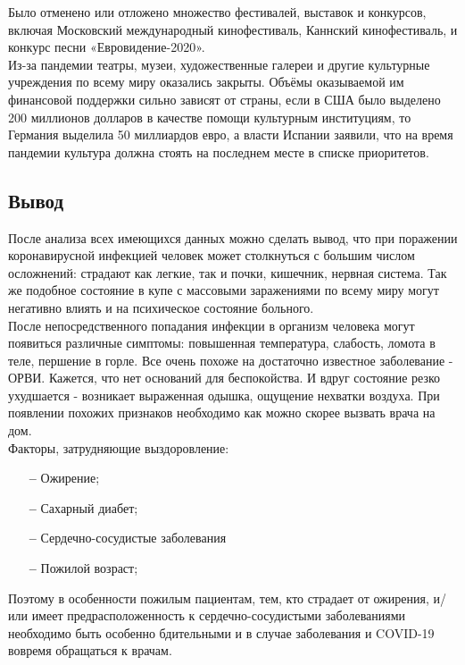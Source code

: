 \documentclass[a4paper, 12pt]{extarticle}
\begin{document}
Было отменено или отложено множество фестивалей, выставок и конкурсов, включая
Московский международный кинофестиваль, Каннский кинофестиваль, и конкурс песни
«Евровидение-2020».
\\

Из-за пандемии театры, музеи, художественные галереи и другие культурные
учреждения по всему миру оказались закрыты. Объёмы оказываемой им финансовой
поддержки сильно зависят от страны, если в США было выделено 200 миллионов
долларов в качестве помощи культурным институциям, то Германия выделила 50
миллиардов евро, а власти Испании заявили, что на время пандемии культура
должна стоять на последнем месте в списке приоритетов.
\newpage

\subsection{Вывод}
После анализа всех имеющихся данных можно сделать вывод, что
при поражении коронавирусной инфекцией человек может столкнуться с большим числом
осложнений: страдают как легкие, так и почки, кишечник, нервная система. Так же
подобное состояние в купе с массовыми заражениями по всему миру могут негативно
влиять и на психическое состояние больного.
\\

После непосредственного попадания инфекции в организм человека могут появиться
различные симптомы: повышенная температура, слабость, ломота в теле, першение в горле.
Все очень похоже на достаточно известное заболевание - ОРВИ. Кажется, что нет
оснований для беспокойства. И вдруг состояние резко ухудшается - возникает
выраженная одышка, ощущение нехватки воздуха. При появлении похожих признаков
необходимо как можно скорее вызвать врача на дом.
\\

Факторы, затрудняющие выздоровление:
\begin{itemize}
    \item[\bfseries--] Ожирение;
    \item[\bfseries--] Сахарный диабет;
    \item[\bfseries--] Сердечно-сосудистые заболевания
    \item[\bfseries--] Пожилой возраст;
\end{itemize}

Поэтому в особенности пожилым пациентам, тем, кто страдает от ожирения, и/или имеет
предрасположенность к сердечно-сосудистыми заболеваниями необходимо быть
особенно бдительными и в случае заболевания и COVID-19 вовремя обращаться к
врачам.
\\
\end{document}
